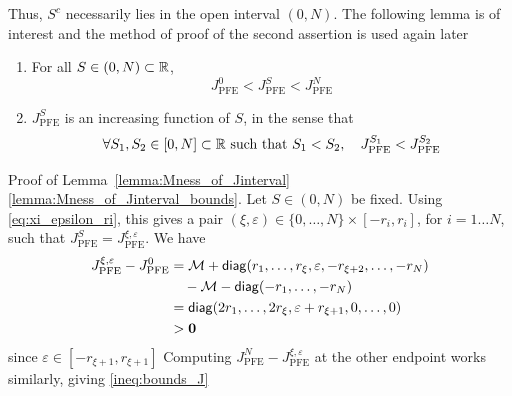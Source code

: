 \documentclass[aspectratio=169]{beamer}
\begin{document}
\begin{frame}
	Thus, $S^c$ necessarily lies in the open interval $(0,N)$.
	The following lemma is of interest and the method of proof of the second assertion is used again later
	\vfill
	\begin{lemma}\label{lemma:Mness_of_Jinterval}
	\begin{enumerate}
		\item \label{lemma:Mness_of_Jinterval_bounds}
		For all $S\in(0,N)\subset\mathbb{R}$,
		\begin{equation}\label{ineq:bounds_J}
		J_{\textrm{PFE}}^{0}< J_{\textrm{PFE}}^{S}<
		J_{\textrm{PFE}}^{N}
		\end{equation}
		\item \label{lemma:Mness_of_Jinterval_increase}
		$J_{\textrm{PFE}}^{S}$ is an increasing function of $S$, in the sense that
	\begin{equation}\label{eq:J_increasing}
	\forall S_1,S_2\in[0,N]\subset\mathbb{R}\textrm{ such that }S_1<S_2,
	\quad
	J_{\textrm{PFE}}^{S_1}< J_{\textrm{PFE}}^{S_2}
	\end{equation}
	\end{enumerate}
	\end{lemma}
\end{frame}


\begin{frame}{Proof of Lemma~\ref{lemma:Mness_of_Jinterval}}
\ref{lemma:Mness_of_Jinterval_bounds}.
	Let $S\in(0,N)$ be fixed.
	Using \eqref{eq:xi_epsilon_ri}, this gives a pair $(\xi,\varepsilon)\in\{0,\ldots,N\}\times[-r_i,r_i]$, for $i=1\ldots N$, such that $J_{\textrm{PFE}}^{S}=J_{\textrm{PFE}}^{\xi,\varepsilon}$.
	We have
	\begin{align*}
	J_{\textrm{PFE}}^{\xi,\varepsilon}-J_{\textrm{PFE}}^{0} 
	&= \M+\diag(r_1,\ldots,r_{\xi},\varepsilon,-r_{\xi+2},\ldots,-r_N) \\
	&\quad -\M-\diag(-r_1,\ldots,-r_N) \\
	&= \diag(2r_1,\ldots,2r_{\xi},\varepsilon+r_{\xi+1},0,\ldots,0) \\
	&>\b0
	\end{align*}
	since $\varepsilon\in[-r_{\xi+1},r_{\xi+1}]$
	\vfill
	Computing $J_{\textrm{PFE}}^{N}-J_{\textrm{PFE}}^{\xi,\varepsilon}$ at the other endpoint works similarly, giving \eqref{ineq:bounds_J}
\end{frame}
\end{document}
